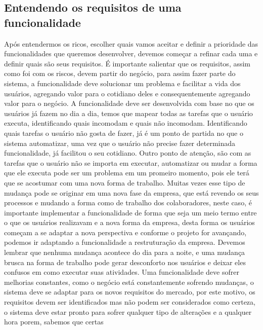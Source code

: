     \subsection{Entendendo os requisitos de uma funcionalidade}
    Após entendermos os ricos, escolher quais vamos aceitar e definir a prioridade
    das funcionalidades que queremos desenvolver, devemos começar a refinar cada
    uma e definir quais são seus requisitos. É importante salientar que os
    requisitos, assim como foi com os riscos, devem partir do negócio, para assim
    fazer parte do sistema, a funcionalidade deve solucionar um problema e facilitar
    a vida dos usuários, agregando valor para o cotidiano deles e consequentemente
    agregando valor para o negócio. \newline
    A funcionalidade deve ser desenvolvida com base no que os usuários já fazem
    no dia a dia, temos que mapear todas as tarefas que o usuário executa,
    identificando quais incomodam e quais não incomodam. Identificando quais tarefas
    o usuário não gosta de fazer, já é um ponto de partida no que o sistema
    automatizar, uma vez que o usuário não precise fazer determinada funcionalidade,
    já facilitou o seu cotidiano. Outro ponto de atenção, são com as tarefas que
    o usuário não se importa em executar, automatizar ou mudar a forma que ele
    executa pode ser um problema em um promeiro momento, pois ele terá que se
    acostumar com uma nova forma de trabalho. Muitas vezes esse tipo de mudança
    pode se originar em uma nova fase da empresa, que está revendo os seus processos
    e mudando a forma como de trabalho dos colaboradores, neste caso, é importante
    implementar a funcionalidade de forma que seja um meio termo entre o que os
    usuários realizavam e a nova forma da empresa, desta forma os usuários
    começam a se adaptar a nova perspectiva e conforme o projeto for avançando,
    podemos ir adaptando a funcionalidade a restruturação da empresa. Devemos
    lembrar que nenhuma mudança acontece do dia para a noite, e uma mudança
    brusca na forma de trabalho pode gerar desconforto nos usuários e deixar eles
    confusos em como executar suas atividades. \newline
    Uma funcionalidade deve sofrer melhorias constantes, como o negócio está
    constantemente sofrendo mudanças, o sistema deve se adaptar para os novos
    requisitos do mercado, por este motivo, os requisitos devem ser identificados
    mas não podem ser considerados como certeza, o sistema deve estar pronto para
    sofrer qualquer tipo de alterações e a qualquer hora porem, sabemos que certas
